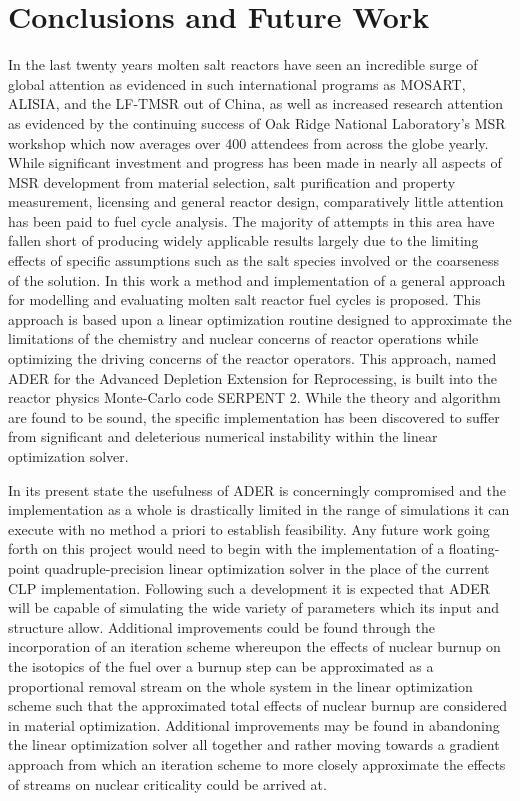 \chapter{Conclusions and Future Work}
\label{ch:conc}

In the last twenty years molten salt reactors have seen an incredible surge of
global attention as evidenced in such international programs as MOSART, ALISIA,
and the LF-TMSR out of China, as well as increased research attention as
evidenced by the continuing success of Oak Ridge National Laboratory's MSR
workshop which now averages over 400 attendees from across the globe yearly. 
While significant investment and progress has been made in nearly all aspects
of MSR development from material selection, salt purification and property
measurement, licensing and general reactor design, comparatively little
attention has been paid to fuel cycle analysis. The majority of attempts in
this area have fallen short of producing widely applicable results largely due
to the limiting effects of specific assumptions such as the salt species
involved or the coarseness of the solution. In this work a method and
implementation of a general approach for modelling and evaluating molten salt
reactor fuel cycles is proposed. This approach is based upon a linear
optimization routine designed to approximate the limitations of the chemistry
and nuclear concerns of reactor operations while optimizing the driving concerns
of the reactor operators. This approach, named ADER for the Advanced Depletion
Extension for Reprocessing, is built into the reactor physics Monte-Carlo code
SERPENT 2.  While the theory and algorithm are found to be
sound, the specific implementation has been discovered to suffer from
significant and deleterious numerical instability within the 
linear optimization solver.

In its present state the usefulness of ADER is concerningly compromised and
the implementation as a whole is drastically limited in the range of simulations
it can execute with no method a priori to establish feasibility. Any future
work going forth on this project would need to begin with the implementation
of a floating-point quadruple-precision linear optimization solver in the place
of the current CLP implementation. Following such a development it is expected
that ADER will be capable of simulating the wide variety of parameters which its
input and structure allow. Additional improvements could be found through the
incorporation of an iteration scheme whereupon the effects of nuclear burnup
on the isotopics of the fuel over a burnup step can be approximated as a
proportional removal stream on the whole system in the linear optimization
scheme such that the approximated total effects of nuclear burnup are considered
in material optimization. Additional improvements may be found in abandoning the
linear optimization solver all together and rather moving towards a gradient
approach from which an iteration scheme to more closely approximate the 
effects of streams on nuclear criticality could be arrived at. 

